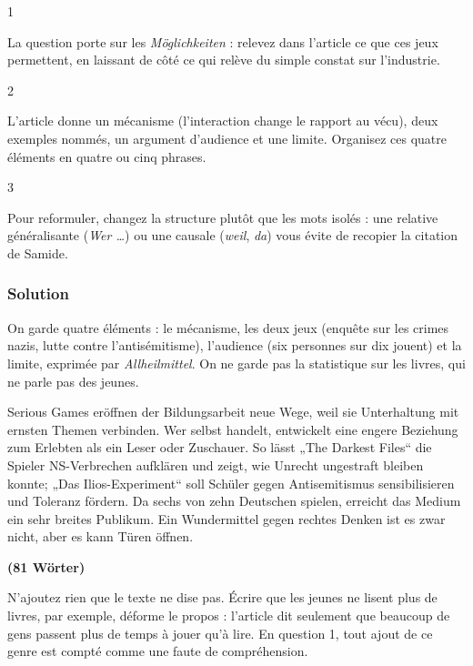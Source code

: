\documentclass[11pt,a4paper]{article}
\begin{document}
\begin{indication}{1}

La question porte sur les \emph{Möglichkeiten} : relevez dans l'article ce que ces jeux permettent, en laissant de côté ce qui relève du simple constat sur l'industrie.

\end{indication}

\begin{indication}{2}

L'article donne un mécanisme (l'interaction change le rapport au vécu), deux exemples nommés, un argument d'audience et une limite. Organisez ces quatre éléments en quatre ou cinq phrases.

\end{indication}

\begin{indication}{3}

Pour reformuler, changez la structure plutôt que les mots isolés : une relative généralisante (\emph{Wer \ldots{}}) ou une causale (\emph{weil}, \emph{da}) vous évite de recopier la citation de Samide.

\end{indication}

\hypertarget{solution}{%
\subsubsection{Solution}\label{solution}}

On garde quatre éléments : le mécanisme, les deux jeux (enquête sur les crimes nazis, lutte contre l'antisémitisme), l'audience (six personnes sur dix jouent) et la limite, exprimée par \emph{Allheilmittel}. On ne garde pas la statistique sur les livres, qui ne parle pas des jeunes.

Serious Games eröffnen der Bildungsarbeit neue Wege, weil sie Unterhaltung mit ernsten Themen verbinden. Wer selbst handelt, entwickelt eine engere Beziehung zum Erlebten als ein Leser oder Zuschauer. So lässt „The Darkest Files`` die Spieler NS-Verbrechen aufklären und zeigt, wie Unrecht ungestraft bleiben konnte; „Das Ilios-Experiment`` soll Schüler gegen Antisemitismus sensibilisieren und Toleranz fördern. Da sechs von zehn Deutschen spielen, erreicht das Medium ein sehr breites Publikum. Ein Wundermittel gegen rechtes Denken ist es zwar nicht, aber es kann Türen öffnen.

\textbf{(81 Wörter)}

\begin{piege}

N'ajoutez rien que le texte ne dise pas. Écrire que les jeunes ne lisent plus de livres, par exemple, déforme le propos : l'article dit seulement que beaucoup de gens passent plus de temps à jouer qu'à lire. En question 1, tout ajout de ce genre est compté comme une faute de compréhension.

\end{piege}
\end{document}
